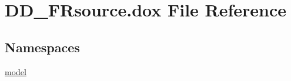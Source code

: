 \hypertarget{_d_d___f_rsource_8dox}{}\section{D\+D\+\_\+\+F\+Rsource.\+dox File Reference}
\label{_d_d___f_rsource_8dox}
\subsection*{Namespaces}
\begin{DoxyCompactItemize}
\item 
 \hyperlink{namespacemodel}{model}
\end{DoxyCompactItemize}
